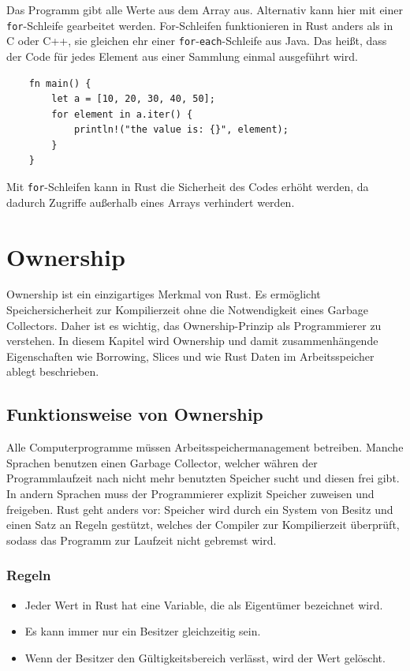 Das Programm gibt alle Werte aus dem Array aus. Alternativ kann hier mit einer \verb"for"-Schleife gearbeitet werden. For-Schleifen funktionieren in Rust anders als in C oder C++, sie gleichen ehr einer \verb"for"-\verb"each"-Schleife aus Java. Das heißt, dass der Code für jedes Element aus einer Sammlung einmal ausgeführt wird.

\begin{lstlisting}
    fn main() {
        let a = [10, 20, 30, 40, 50];
        for element in a.iter() {
            println!("the value is: {}", element);
        }
    }
\end{lstlisting}

Mit \verb"for"-Schleifen kann in Rust die Sicherheit des Codes erhöht werden, da dadurch Zugriffe außerhalb eines Arrays verhindert werden.


\section{Ownership}

Ownership ist ein einzigartiges Merkmal von Rust. Es ermöglicht Speichersicherheit zur Kompilierzeit ohne die Notwendigkeit eines Garbage Collectors. Daher ist es wichtig, das Ownership-Prinzip als Programmierer zu verstehen. In diesem Kapitel wird Ownership und damit zusammenhängende Eigenschaften wie Borrowing, Slices und wie Rust Daten im Arbeitsspeicher ablegt beschrieben.

\subsection{Funktionsweise von Ownership}

Alle Computerprogramme müssen Arbeitsspeichermanagement betreiben. Man\-che Sprachen benutzen einen Garbage Collector, welcher währen der Programmlaufzeit nach nicht mehr benutzten Speicher sucht und diesen frei gibt. In andern Sprachen muss der Programmierer explizit Speicher zuweisen und freigeben. Rust geht anders vor: Speicher wird durch ein System von Besitz und einen Satz an Regeln gestützt, welches der Compiler zur Kompilierzeit überprüft, sodass das Programm zur Laufzeit nicht gebremst wird.

\subsubsection{Regeln}

\begin{itemize}
    \item Jeder Wert in Rust hat eine Variable, die als Eigentümer bezeichnet wird.
    \item Es kann immer nur ein Besitzer gleichzeitig sein.
    \item Wenn der Besitzer den Gültigkeitsbereich verlässt, wird der Wert gelöscht.
\end{itemize}

